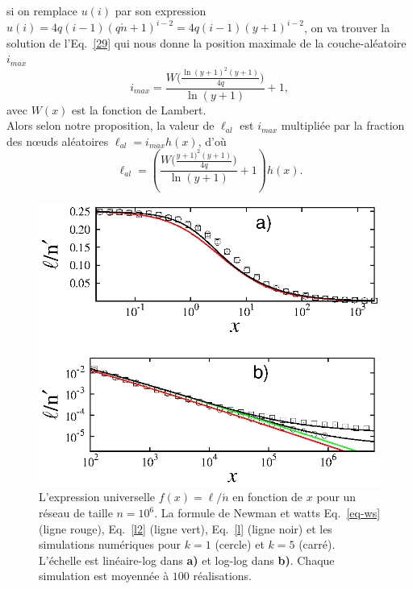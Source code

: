 si on remplace $u(i)$ par son expression $u(i)=4q(i-1)(q\acute{n}+1)^{i-2}=4q(i-1)(y+1)^{i-2}$, on va trouver la solution de l'Eq.~\eqref{29} qui nous 
donne la position maximale de la couche-aléatoire $i_{max}$ 
\begin{equation}
i_{max}=\frac{W\big(\frac{\ln(y+1)^2(y+1)}{4q}\big)}{\ln(y+1)}+1,
\end{equation}
avec $W(x)$ est la fonction de Lambert.\\
Alors selon notre proposition, la valeur de $\ell_{al}$ est $i_{max}$ multipliée par la fraction des nœuds aléatoires $\ell_{al}=i_{max}h(x)$, d'où 
\begin{equation}
\ell_{al}=(\frac{W\big(\frac{y+1)^2(y+1)}{4q}\big)}{\ln(y+1)}+1)h(x).
\label{lal}
\end{equation}
\begin{figure}[h!]
	\centering
	\includegraphics[scale=1.25,angle=0]{./figures/fig-kpn}
	\caption{L'expression universelle $f(x)=\ell/\acute{n}$ en fonction de $x$ pour un réseau de taille $n=10^6$. La formule de Newman et watts Eq.~\eqref{eq-ws} (ligne rouge), Eq.~\eqref{l2} (ligne vert), Eq.~\eqref{l} (ligne noir) et les simulations numériques pour $k=1$ (cercle) et $k=5$ (carré). L'échelle est linéaire-log dans \textbf{a)} et log-log dans \textbf{b)}. Chaque simulation est moyennée à $100$ réalisations.}
	\label{chemin}
\end{figure}

